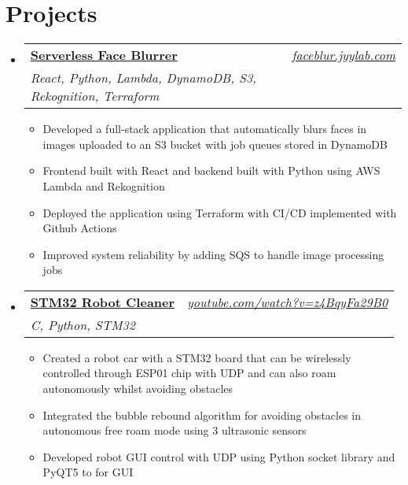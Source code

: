 \documentclass[letterpaper,11pt]{article}
\makeatletter
\newcommand{\resumeItem}[1]{
  \item\small{
    {#1 \vspace{-2pt}}
  }
}
\newcommand{\resumeSubheading}[4]{
  \vspace{-2pt}\item
    \begin{tabular*}{0.97\textwidth}[t]{l@{\extracolsep{\fill}}r}
      \textbf{#1} & #2 \\
      \textit{\small#3} & \textit{\small #4} \\
    \end{tabular*}\vspace{-7pt}
}
\newcommand{\resumeSubHeadingListStart}{\begin{itemize}[leftmargin=0.08in, label={}]}
\newcommand{\resumeSubHeadingListEnd}{\end{itemize}}
\newcommand{\resumeItemListStart}{\begin{itemize}[leftmargin=0.22in]}
\newcommand{\resumeItemListEnd}{\end{itemize}\vspace{-5pt}}
\makeatother
\begin{document}
\section{Projects}
    \resumeSubHeadingListStart
        \resumeSubheading
            {\textbf{\href{https://faceblur.jyylab.com}{Serverless Face Blurrer}}}{\emph{\href{https://faceblur.jyylab.com}{faceblur.jyylab.com}}}
            {React, Python, Lambda, DynamoDB, S3, Rekognition, Terraform}{}
            \resumeItemListStart
                \resumeItem{Developed a full-stack application that automatically blurs faces in images uploaded to an S3 bucket with job queues stored in DynamoDB}
                \resumeItem{Frontend built with React and backend built with Python using AWS Lambda and Rekognition}
                \resumeItem{Deployed the application using Terraform with CI/CD implemented with Github Actions}
                \resumeItem{Improved system reliability by adding SQS to handle image processing jobs}
            \resumeItemListEnd
        \resumeSubheading
            {\textbf{\href{https://github.com/jamesyoung-15/mini-robot-cleaner}{STM32 Robot Cleaner}}}{\emph{\href{https://youtube.com/watch?v=z4BqyFa29B0}{youtube.com/watch?v=z4BqyFa29B0}}}
            {C, Python, STM32}{}
            \resumeItemListStart
            \resumeItem{Created a robot car with a STM32 board that can be wirelessly controlled through ESP01 chip with UDP and can also roam autonomously whilst avoiding obstacles}
            \resumeItem{Integrated the bubble rebound algorithm for avoiding obstacles in autonomous free roam mode using 3 ultrasonic sensors}
            \resumeItem{Developed robot GUI control with UDP using Python socket library and PyQT5 to for GUI}
            \resumeItemListEnd
    \resumeSubHeadingListEnd
\end{document}
